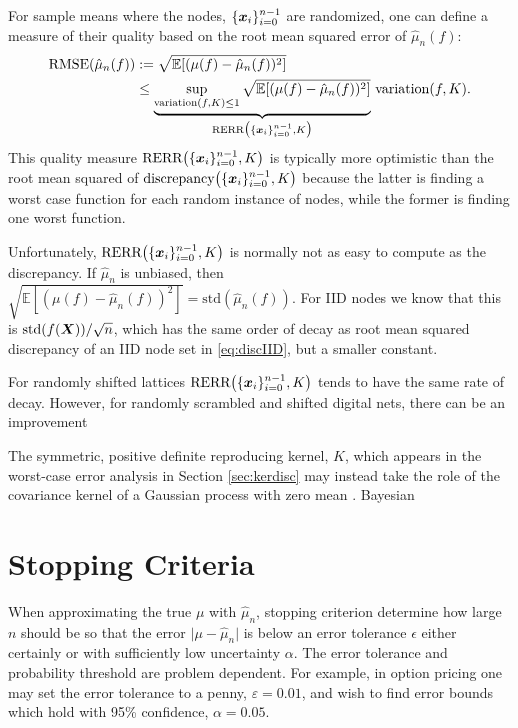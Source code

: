 \documentclass{svproc}
\begin{document}
For sample means where the nodes, $\{{\boldsymbol{x}}_i\}_{i=0}^{n-1}$ are randomized, one can define a measure of their quality based on the root mean squared error of $\hat{\mu}_n(f)$:
\begin{align}
    \text{RMSE}(\hat{\mu}_n(f)) & : = \sqrt{\mathbb{E}[(\mu(f) - \hat{\mu}_n(f))^2]} \\
    &\le \underbrace{ \sup_{\text{variation}(f,K) \le 1} \sqrt{\mathbb{E}[(\mu(f) - \hat{\mu}_n(f))^2]}}_{\text{RERR}\bigl(\{{\boldsymbol{x}}_i\}_{i=0}^{n-1},K\bigr)} \, \text{variation}(f,K).
\end{align}
This quality measure $\text{RERR}\bigl(\{{\boldsymbol{x}}_i\}_{i=0}^{n-1},K\bigr)$ is typically more optimistic than the root mean squared of  $\text{discrepancy}\bigl(\{{\boldsymbol{x}}_i\}_{i=0}^{n-1},K\bigr)$ because the latter is finding a worst case function for each random instance of nodes, while the former is finding one worst function.

Unfortunately, $\text{RERR}\bigl(\{{\boldsymbol{x}}_i\}_{i=0}^{n-1},K\bigr)$ is normally not as easy to compute as the discrepancy.  If $\hat{\mu}_n$ is unbiased, then $\sqrt{\mathbb{E}[(\mu(f) - \hat{\mu}_n(f))^2]} = \text{std}(\hat{\mu}_n(f))$.  For IID nodes we know that this is $\text{std}(f({\boldsymbol{X}}))/\sqrt{n}$, which has the same order of decay as root mean squared discrepancy of an IID node set in \eqref{eq:discIID}, but a smaller constant.

For randomly shifted lattices $\text{RERR}\bigl(\{{\boldsymbol{x}}_i\}_{i=0}^{n-1},K\bigr)$ tends to have the same rate of decay.  However, for randomly scrambled and shifted digital nets, there can be an improvement

The symmetric, positive definite reproducing kernel, $K$, which appears in the worst-case error analysis in Section \ref{sec:kerdisc} may instead take the role of the covariance kernel of a Gaussian process with zero mean \cite{}.  Bayesian



\section{Stopping Criteria} \label{sec:stop}


When approximating the true $\mu$ with $\hat{\mu}_n$, stopping criterion determine how large $n$ should be so that the error $\lvert \mu - \hat{\mu}_n \rvert$ is below an error tolerance $\epsilon$ either certainly or with sufficiently low uncertainty $\alpha$. The error tolerance and probability threshold are problem dependent. For example, in option pricing one may set the error tolerance to a penny, $\varepsilon=0.01$, and wish to find error bounds which hold with 95\% confidence, $\alpha=0.05$. 
\end{document}
